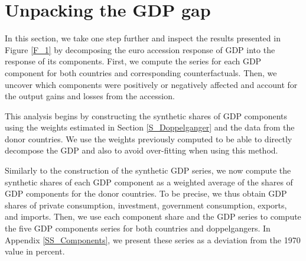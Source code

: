 \documentclass[12pt]{article}
\newcommand{\annote}[1]{\parbox{\textwidth}{\renewcommand{\baselinestretch}{1.0}\vspace{12pt} \small Notes: #1}}
\begin{document}



\section{Unpacking the GDP gap \label{S_Components}}

In this section, we take one step further and inspect the results presented in Figure \ref{F_1} by decomposing the euro accession response of GDP into the response of its components. First, we compute the series for each GDP component for both countries and corresponding counterfactuals. Then, we uncover which components were positively or negatively affected and account for the output gains and losses from the accession. 

This analysis begins by constructing the synthetic shares of GDP components using the weights estimated in Section \ref{S_Doppelganger} and the data from the donor countries. We use the weights previously computed to be able to directly decompose the GDP and also to avoid over-fitting when using this method.

Similarly to the construction of the synthetic GDP series, we now compute the synthetic shares of each GDP component as a weighted average of the shares of GDP components for the donor countries. To be precise, we thus obtain GDP shares of private consumption, investment, government consumption, exports, and imports. Then, we use each component share and the GDP series to compute the five GDP components series for both countries and doppelgangers. In Appendix \ref{SS_Components}, we present these series as a deviation from the 1970 value in percent.
\end{document}
